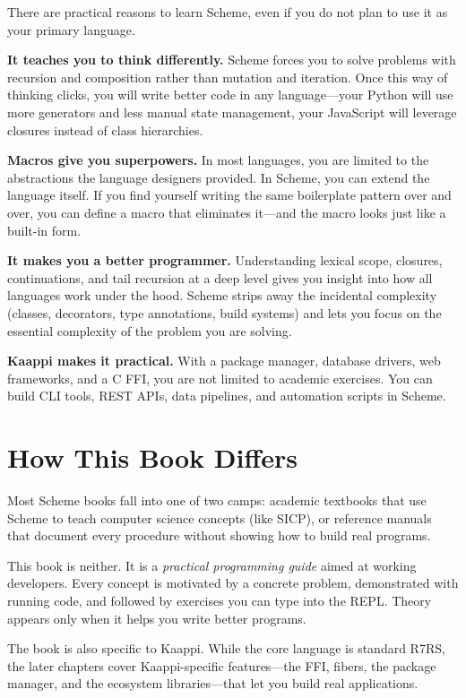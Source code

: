 There are practical reasons to learn Scheme, even if you do not plan to use it as your primary language.

\textbf{It teaches you to think differently.} Scheme forces you to solve problems with recursion and composition rather than mutation and iteration. Once this way of thinking clicks, you will write better code in any language---your Python will use more generators and less manual state management, your JavaScript will leverage closures instead of class hierarchies.

\textbf{Macros give you superpowers.} In most languages, you are limited to the abstractions the language designers provided. In Scheme, you can extend the language itself. If you find yourself writing the same boilerplate pattern over and over, you can define a macro that eliminates it---and the macro looks just like a built-in form.

\textbf{It makes you a better programmer.} Understanding lexical scope, closures, continuations, and tail recursion at a deep level gives you insight into how all languages work under the hood. Scheme strips away the incidental complexity (classes, decorators, type annotations, build systems) and lets you focus on the essential complexity of the problem you are solving.

\textbf{Kaappi makes it practical.} With a package manager, database drivers, web frameworks, and a C FFI, you are not limited to academic exercises. You can build CLI tools, REST APIs, data pipelines, and automation scripts in Scheme.

\section{How This Book Differs}

Most Scheme books fall into one of two camps: academic textbooks that use Scheme to teach computer science concepts (like SICP), or reference manuals that document every procedure without showing how to build real programs.

This book is neither. It is a \emph{practical programming guide} aimed at working developers. Every concept is motivated by a concrete problem, demonstrated with running code, and followed by exercises you can type into the REPL. Theory appears only when it helps you write better programs.

The book is also specific to Kaappi. While the core language is standard R7RS, the later chapters cover Kaappi-specific features---the FFI, fibers, the package manager, and the ecosystem libraries---that let you build real applications.

